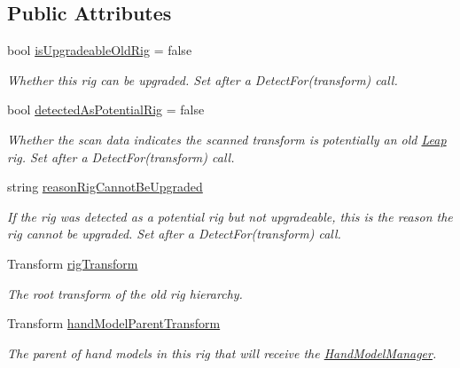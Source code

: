 \subsection*{Public Attributes}
\begin{DoxyCompactItemize}
\item 
bool \mbox{\hyperlink{class_leap_1_1_unity_1_1_old_rig_hierarchy_a87664484cd178765c4ee65191b04fbb9}{is\+Upgradeable\+Old\+Rig}} = false
\begin{DoxyCompactList}\small\item\em Whether this rig can be upgraded. Set after a Detect\+For(transform) call. \end{DoxyCompactList}\item 
bool \mbox{\hyperlink{class_leap_1_1_unity_1_1_old_rig_hierarchy_afd19c98916c5f3f8f2e838499d2bd872}{detected\+As\+Potential\+Rig}} = false
\begin{DoxyCompactList}\small\item\em Whether the scan data indicates the scanned transform is potentially an old \mbox{\hyperlink{namespace_leap_1_1_unity_1_1_leap}{Leap}} rig. Set after a Detect\+For(transform) call. \end{DoxyCompactList}\item 
string \mbox{\hyperlink{class_leap_1_1_unity_1_1_old_rig_hierarchy_aac4f3649429ca51cb15b614ee514147e}{reason\+Rig\+Cannot\+Be\+Upgraded}}
\begin{DoxyCompactList}\small\item\em If the rig was detected as a potential rig but not upgradeable, this is the reason the rig cannot be upgraded. Set after a Detect\+For(transform) call. \end{DoxyCompactList}\item 
Transform \mbox{\hyperlink{class_leap_1_1_unity_1_1_old_rig_hierarchy_adef150bfa76ed5c64ad298d1b0f40d4a}{rig\+Transform}}
\begin{DoxyCompactList}\small\item\em The root transform of the old rig hierarchy. \end{DoxyCompactList}\item 
Transform \mbox{\hyperlink{class_leap_1_1_unity_1_1_old_rig_hierarchy_a23b887e672e43860cbe4417247cc57b9}{hand\+Model\+Parent\+Transform}}
\begin{DoxyCompactList}\small\item\em The parent of hand models in this rig that will receive the \mbox{\hyperlink{class_leap_1_1_unity_1_1_hand_model_manager}{Hand\+Model\+Manager}}. \end{DoxyCompactList}\item 

\end{DoxyCompactItemize}
